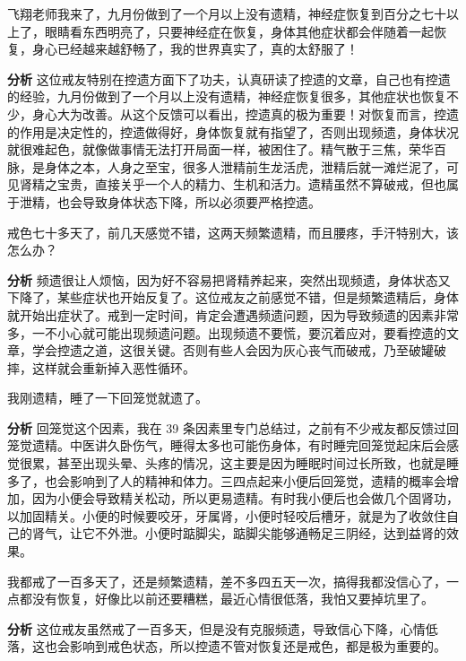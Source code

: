 \begin{case}
    飞翔老师我来了，九月份做到了一个月以上没有遗精，神经症恢复到百分之七十以上了，眼睛看东西明亮了，只要神经症在恢复，身体其他症状都会伴随着一起恢复，身心已经越来越舒畅了，我的世界真实了，真的太舒服了！

    \textbf{分析} 这位戒友特别在控遗方面下了功夫，认真研读了控遗的文章，自己也有控遗的经验，九月份做到了一个月以上没有遗精，神经症恢复很多，其他症状也恢复不少，身心大为改善。从这个反馈可以看出，控遗真的极为重要！对恢复而言，控遗的作用是决定性的，控遗做得好，身体恢复就有指望了，否则出现频遗，身体状况就很难起色，就像做事情无法打开局面一样，被困住了。精气散于三焦，荣华百脉，是身体之本，人身之至宝，很多人泄精前生龙活虎，泄精后就一滩烂泥了，可见肾精之宝贵，直接关乎一个人的精力、生机和活力。遗精虽然不算破戒，但也属于泄精，也会导致身体状态下降，所以必须要严格控遗。
\end{case}

\begin{case}
    戒色七十多天了，前几天感觉不错，这两天频繁遗精，而且腰疼，手汗特别大，该怎么办？

    \textbf{分析} 频遗很让人烦恼，因为好不容易把肾精养起来，突然出现频遗，身体状态又下降了，某些症状也开始反复了。这位戒友之前感觉不错，但是频繁遗精后，身体就开始出症状了。戒到一定时间，肯定会遭遇频遗问题，因为导致频遗的因素非常多，一不小心就可能出现频遗问题。出现频遗不要慌，要沉着应对，要看控遗的文章，学会控遗之道，这很关键。否则有些人会因为灰心丧气而破戒，乃至破罐破摔，这样就会重新掉入恶性循环。
\end{case}

\begin{case}
    我刚遗精，睡了一下回笼觉就遗了。

    \textbf{分析} 回笼觉这个因素，我在 39 条因素里专门总结过，之前有不少戒友都反馈过回笼觉遗精。中医讲久卧伤气，睡得太多也可能伤身体，有时睡完回笼觉起床后会感觉很累，甚至出现头晕、头疼的情况，这主要是因为睡眠时间过长所致，也就是睡多了，也会影响到了人的精神和体力。三四点起来小便后回笼觉，遗精的概率会增加，因为小便会导致精关松动，所以更易遗精。有时我小便后也会做几个固肾功，以加固精关。小便的时候要咬牙，牙属肾，小便时轻咬后槽牙，就是为了收敛住自己的肾气，让它不外泄。小便时踮脚尖，踮脚尖能够通畅足三阴经，达到益肾的效果。
\end{case}

\begin{case}
    我都戒了一百多天了，还是频繁遗精，差不多四五天一次，搞得我都没信心了，一点都没有恢复，好像比以前还要糟糕，最近心情很低落，我怕又要掉坑里了。

    \textbf{分析} 这位戒友虽然戒了一百多天，但是没有克服频遗，导致信心下降，心情低落，这也会影响到戒色状态，所以控遗不管对恢复还是戒色，都是极为重要的。
\end{case}

